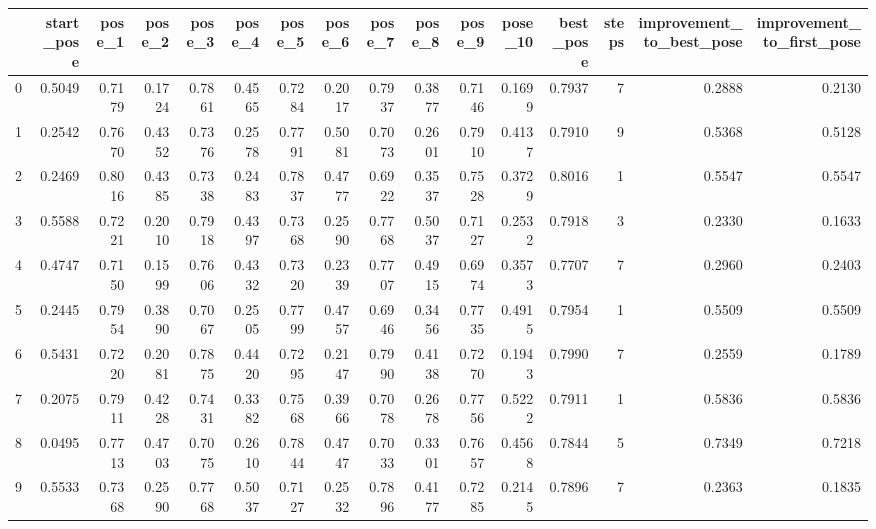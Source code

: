 \begin{tabular}{lrrrrrrrrrrrrrrr}
\toprule
{} &  start\_pose &  pose\_1 &  pose\_2 &  pose\_3 &  pose\_4 &  pose\_5 &  pose\_6 &  pose\_7 &  pose\_8 &  pose\_9 &  pose\_10 &  best\_pose &  steps &  improvement\_to\_best\_pose &  improvement\_to\_first\_pose \\
\midrule
0   &      0.5049 &  0.7179 &  0.1724 &  0.7861 &  0.4565 &  0.7284 &  0.2017 &  0.7937 &  0.3877 &  0.7146 &   0.1699 &     0.7937 &      7 &                    0.2888 &                     0.2130 \\
1   &      0.2542 &  0.7670 &  0.4352 &  0.7376 &  0.2578 &  0.7791 &  0.5081 &  0.7073 &  0.2601 &  0.7910 &   0.4137 &     0.7910 &      9 &                    0.5368 &                     0.5128 \\
2   &      0.2469 &  0.8016 &  0.4385 &  0.7338 &  0.2483 &  0.7837 &  0.4777 &  0.6922 &  0.3537 &  0.7528 &   0.3729 &     0.8016 &      1 &                    0.5547 &                     0.5547 \\
3   &      0.5588 &  0.7221 &  0.2010 &  0.7918 &  0.4397 &  0.7368 &  0.2590 &  0.7768 &  0.5037 &  0.7127 &   0.2532 &     0.7918 &      3 &                    0.2330 &                     0.1633 \\
4   &      0.4747 &  0.7150 &  0.1599 &  0.7606 &  0.4332 &  0.7320 &  0.2339 &  0.7707 &  0.4915 &  0.6974 &   0.3573 &     0.7707 &      7 &                    0.2960 &                     0.2403 \\
5   &      0.2445 &  0.7954 &  0.3890 &  0.7067 &  0.2505 &  0.7799 &  0.4757 &  0.6946 &  0.3456 &  0.7735 &   0.4915 &     0.7954 &      1 &                    0.5509 &                     0.5509 \\
6   &      0.5431 &  0.7220 &  0.2081 &  0.7875 &  0.4420 &  0.7295 &  0.2147 &  0.7990 &  0.4138 &  0.7270 &   0.1943 &     0.7990 &      7 &                    0.2559 &                     0.1789 \\
7   &      0.2075 &  0.7911 &  0.4228 &  0.7431 &  0.3382 &  0.7568 &  0.3966 &  0.7078 &  0.2678 &  0.7756 &   0.5222 &     0.7911 &      1 &                    0.5836 &                     0.5836 \\
8   &      0.0495 &  0.7713 &  0.4703 &  0.7075 &  0.2610 &  0.7844 &  0.4747 &  0.7033 &  0.3301 &  0.7657 &   0.4568 &     0.7844 &      5 &                    0.7349 &                     0.7218 \\
9   &      0.5533 &  0.7368 &  0.2590 &  0.7768 &  0.5037 &  0.7127 &  0.2532 &  0.7896 &  0.4177 &  0.7285 &   0.2145 &     0.7896 &      7 &                    0.2363 &                     0.1835 \\

\end{tabular}
